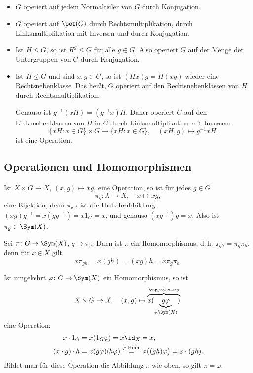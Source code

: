 \documentclass[11pt]{article}
\begin{document}
\begin{example}
  \begin{itemize}
    \item $G$ operiert auf jedem Normalteiler von $G$ durch Konjugation.
    \item $G$ operiert auf $\pot(G)$ durch Rechtsmultiplikation, durch Linksmultiplikation mit Inversen und durch Konjugation.
    \item Ist $H \le G$, so ist $H^g \le G$ für alle $g \in G$. Also operiert $G$ auf der Menge der Untergruppen von $G$ durch Konjugation.
    \item Ist $H \le G$ und sind $x, g \in G$, so ist $(Hx)g = H(xg)$ wieder eine Rechtsnebenklasse. Das heißt, $G$ operiert auf den Rechtsnebenklassen von $H$ durch Rechtsmultiplikation.

      Genauso ist $g^{-1}(xH) = (g^{-1}x)H$. Daher operiert $G$ auf den Linksnebenklassen von $H$ in $G$ durch Linksmultiplikation mit Inversen:
      \[ \{xH : x \in G\} \times G \to \{xH : x \in G\}, \quad (xH, g) \mapsto g^{-1} x H, \]
      ist eine Operation.
  \end{itemize}
\end{example}

\subsection{Operationen und Homomorphismen}

Ist $X \times G \to X$, $(x, g) \mapsto xg$, eine Operation, so ist für jedes $g \in G$
\[ \pi_g\colon X \to X, \quad x \mapsto xg, \]
eine Bijektion, denn $\pi_{g^{-1}}$ ist die Umkehrabbildung: $(xg)g^{-1} = x(gg^{-1}) = x 1_G = x$, und genauso $(xg^{-1})g = x$. Also ist $\pi_g \in \Sym(X)$.

Sei $\pi\colon G \to \Sym(X)$, $g \mapsto \pi_g$. Dann ist $\pi$ ein Homomorphismus, d.\,h. $\pi_{gh} = \pi_g \pi_h$, denn für $x \in X$ gilt
\[ x \pi_{gh} = x(gh) = (xg)h = x \pi_g \pi_h. \]

Ist umgekehrt $\varphi\colon G \to \Sym(X)$ ein Homomorphismus, so ist
\[ X \times G \to X, \quad (x, g) \mapsto \overbrace{x(\underbrace{g\varphi}_{\in \Sym(X)})}^{\eqqcolon x \cdot g}, \]
eine Operation:
\begin{align*}
  x \cdot 1_G &= x(1_G \varphi) = x \id_X = x, \\
  (x \cdot g) \cdot h &= x(g\varphi)(h\varphi) \overset{\varphi \text{ Hom.}}{=} x\bigl((gh)\varphi\bigr) = x \cdot (gh).
\end{align*}
Bildet man für diese Operation die Abbildung $\pi$ wie oben, so gilt $\pi = \varphi$.
\end{document}
